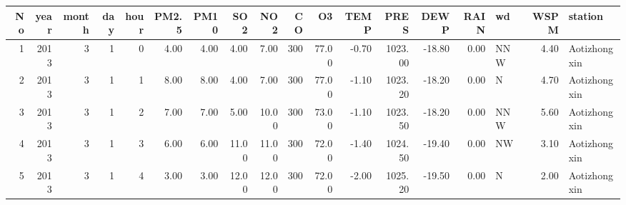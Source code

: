 \begin{table}[ht]
\centering
\begin{tabular}{rrrrrrrrrrrrrrrlrl}
  \hline
No & year & month & day & hour & PM2.5 & PM10 & SO2 & NO2 & CO & O3 & TEMP & PRES & DEWP & RAIN & wd & WSPM & station \\ 
  \hline
  1 & 2013 &   3 &   1 &   0 & 4.00 & 4.00 & 4.00 & 7.00 & 300 & 77.00 & -0.70 & 1023.00 & -18.80 & 0.00 & NNW & 4.40 & Aotizhongxin \\ 
    2 & 2013 &   3 &   1 &   1 & 8.00 & 8.00 & 4.00 & 7.00 & 300 & 77.00 & -1.10 & 1023.20 & -18.20 & 0.00 & N & 4.70 & Aotizhongxin \\ 
    3 & 2013 &   3 &   1 &   2 & 7.00 & 7.00 & 5.00 & 10.00 & 300 & 73.00 & -1.10 & 1023.50 & -18.20 & 0.00 & NNW & 5.60 & Aotizhongxin \\ 
    4 & 2013 &   3 &   1 &   3 & 6.00 & 6.00 & 11.00 & 11.00 & 300 & 72.00 & -1.40 & 1024.50 & -19.40 & 0.00 & NW & 3.10 & Aotizhongxin \\ 
    5 & 2013 &   3 &   1 &   4 & 3.00 & 3.00 & 12.00 & 12.00 & 300 & 72.00 & -2.00 & 1025.20 & -19.50 & 0.00 & N & 2.00 & Aotizhongxin \\ 
   \hline
\end{tabular}
\end{table}
